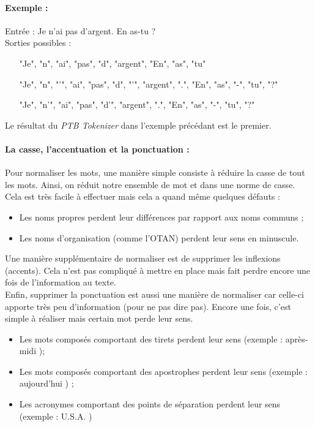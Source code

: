                     \paragraph{Exemple :}
                    Entrée : \og Je n'ai pas d'argent. En as-tu ? \fg\\
                    Sorties possibles :
                    \begin{itemize}
                        \item ["Je", "n", "ai", "pas", "d", "argent", "En", "as", "tu"]
                        \item ["Je", "n", "'", "ai", "pas", "d", "'", "argent", ".", "En", "as", "-", "tu", "?"]
                        \item ["Je", "n'", "ai", "pas", "d'", "argent", ".", "En", "as", "-", "tu", "?"]
                    \end{itemize}
                    Le résultat du \textit{PTB Tokenizer} dans l'exemple précédant est le premier.

                \paragraph{La casse, l'accentuation et la ponctuation :}
                    Pour normaliser les mots, une manière simple consiste à réduire la casse de tout les mots. Ainsi, on réduit notre ensemble de mot et dans une norme de casse. Cela est très facile à effectuer mais cela a quand même quelques défauts :
                    \begin{itemize}
                        \item Les noms propres perdent leur différences par rapport aux noms communs ;
                        \item Les noms d'organisation (comme l'OTAN) perdent leur sens en minuscule.
                    \end{itemize}
                    Une manière supplémentaire de normaliser est de supprimer les inflexions (accents). Cela n'est pas compliqué à mettre en place mais fait perdre encore une fois de l'information au texte.\\
                    Enfin, supprimer la ponctuation est aussi une manière de normaliser car celle-ci apporte très peu d'information (pour ne pas dire pas). Encore une fois, c'est simple à réaliser mais certain mot perde leur sens.
                    \begin{itemize}
                        \item Les mots composés comportant des tirets perdent leur sens (exemple : \og après-midi \fg);
                        \item Les mots composés comportant des apostrophes perdent leur sens (exemple : \og aujourd'hui \fg) ;
                        \item Les acronymes comportant des points de séparation perdent leur sens (exemple : \og U.S.A. \fg)
                    \end{itemize}

